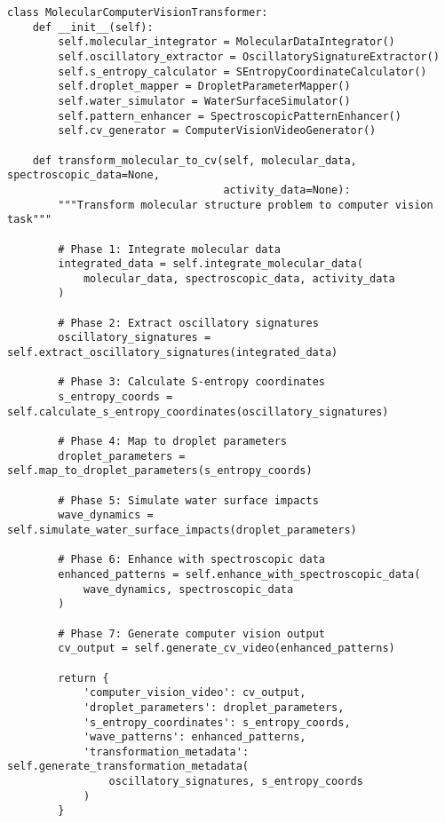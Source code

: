 \documentclass[12pt,a4paper]{article}
\begin{document}
\begin{lstlisting}[style=pythonstyle, caption=Core Molecular-to-Computer Vision Transformation Implementation]
class MolecularComputerVisionTransformer:
    def __init__(self):
        self.molecular_integrator = MolecularDataIntegrator()
        self.oscillatory_extractor = OscillatorySignatureExtractor()
        self.s_entropy_calculator = SEntropyCoordinateCalculator()
        self.droplet_mapper = DropletParameterMapper()
        self.water_simulator = WaterSurfaceSimulator()
        self.pattern_enhancer = SpectroscopicPatternEnhancer()
        self.cv_generator = ComputerVisionVideoGenerator()

    def transform_molecular_to_cv(self, molecular_data, spectroscopic_data=None,
                                  activity_data=None):
        """Transform molecular structure problem to computer vision task"""

        # Phase 1: Integrate molecular data
        integrated_data = self.integrate_molecular_data(
            molecular_data, spectroscopic_data, activity_data
        )

        # Phase 2: Extract oscillatory signatures
        oscillatory_signatures = self.extract_oscillatory_signatures(integrated_data)

        # Phase 3: Calculate S-entropy coordinates
        s_entropy_coords = self.calculate_s_entropy_coordinates(oscillatory_signatures)

        # Phase 4: Map to droplet parameters
        droplet_parameters = self.map_to_droplet_parameters(s_entropy_coords)

        # Phase 5: Simulate water surface impacts
        wave_dynamics = self.simulate_water_surface_impacts(droplet_parameters)

        # Phase 6: Enhance with spectroscopic data
        enhanced_patterns = self.enhance_with_spectroscopic_data(
            wave_dynamics, spectroscopic_data
        )

        # Phase 7: Generate computer vision output
        cv_output = self.generate_cv_video(enhanced_patterns)

        return {
            'computer_vision_video': cv_output,
            'droplet_parameters': droplet_parameters,
            's_entropy_coordinates': s_entropy_coords,
            'wave_patterns': enhanced_patterns,
            'transformation_metadata': self.generate_transformation_metadata(
                oscillatory_signatures, s_entropy_coords
            )
        }


\end{lstlisting}
\end{document}
